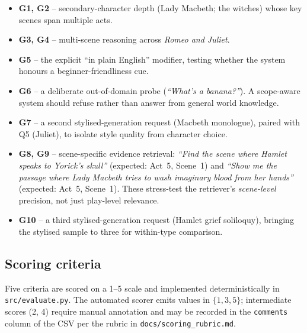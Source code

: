 \documentclass[10pt,conference]{IEEEtran}
\begin{document}
\begin{itemize}
    \item \textbf{G1, G2} -- secondary-character depth (Lady Macbeth;
        the witches) whose key scenes span multiple acts.
    \item \textbf{G3, G4} -- multi-scene reasoning across
        \emph{Romeo and Juliet}.
    \item \textbf{G5} -- the explicit ``in plain English'' modifier,
        testing whether the system honours a beginner-friendliness cue.
    \item \textbf{G6} -- a deliberate out-of-domain probe
        (\emph{``What's a banana?''}). A scope-aware system should
        refuse rather than answer from general world knowledge.
    \item \textbf{G7} -- a second stylised-generation request
        (Macbeth monologue), paired with Q5 (Juliet), to isolate
        style quality from character choice.
    \item \textbf{G8, G9} -- scene-specific evidence retrieval:
        \emph{``Find the scene where Hamlet speaks to Yorick's skull''}
        (expected: Act~5, Scene~1) and \emph{``Show me the passage
        where Lady Macbeth tries to wash imaginary blood from her
        hands''} (expected: Act~5, Scene~1). These stress-test the
        retriever's \emph{scene-level} precision, not just play-level
        relevance.
    \item \textbf{G10} -- a third stylised-generation request
        (Hamlet grief soliloquy), bringing the stylised sample to
        three for within-type comparison.
\end{itemize}

\subsection{Scoring criteria}

Five criteria are scored on a 1--5 scale and implemented
deterministically in \verb|src/evaluate.py|. The automated scorer
emits values in $\{1, 3, 5\}$; intermediate scores (2, 4) require
manual annotation and may be recorded in the \texttt{comments} column
of the CSV per the rubric in \verb|docs/scoring_rubric.md|.
\end{document}
